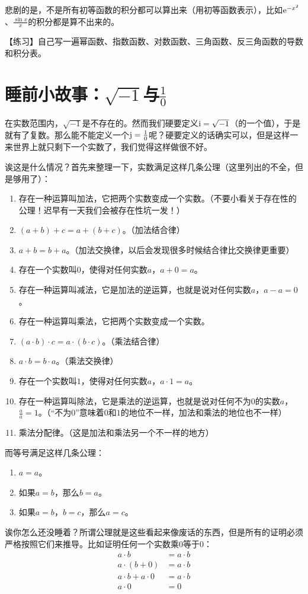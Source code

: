 悲剧的是，不是所有初等函数的积分都可以算出来（用初等函数表示），比如$\mathrm{e}^{-x^2}$、$\frac{\sin x}{x}$的积分都是算不出来的。

【练习】自己写一遍幂函数、指数函数、对数函数、三角函数、反三角函数的导数和积分表。
\section{睡前小故事：$\sqrt{-1}$与$\frac{1}{0}$}
在实数范围内，$\sqrt{-1}$是不存在的。然而我们硬要定义$\mathrm{i}=\sqrt{-1}$（的一个值），于是就有了复数。那么能不能定义一个$\mathrm{j}=\frac{1}{0}$呢？硬要定义的话确实可以，但是这样一来世界上就只剩下一个实数了，我们觉得这样做很不好。

诶这是什么情况？首先来整理一下，实数满足这样几条公理（这里列出的不全，但是够用了）：
\begin{enumerate}
\item 存在一种运算叫加法，它把两个实数变成一个实数。（不要小看关于存在性的公理！迟早有一天我们会被存在性坑一发！）
\item $(a+b)+c=a+(b+c)$。（加法结合律）
\item $a+b=b+a$。（加法交换律，以后会发现很多时候结合律比交换律更重要）
\item 存在一个实数叫$0$，使得对任何实数$a$，$a+0=a$。
\item 存在一种运算叫减法，它是加法的逆运算，也就是说对任何实数$a$，$a-a=0$。
\item 存在一种运算叫乘法，它把两个实数变成一个实数。
\item $(a \cdot b) \cdot c=a \cdot (b \cdot c)$。（乘法结合律）
\item $a \cdot b=b \cdot a$。（乘法交换律）
\item 存在一个实数叫$1$，使得对任何实数$a$，$a \cdot 1=a$。
\item 存在一种运算叫除法，它是乘法的逆运算，也就是说对任何不为$0$的实数$a$，$\frac{a}{a}=1$。（“不为$0$”意味着$0$和$1$的地位不一样，加法和乘法的地位也不一样）
\item 乘法分配律。（这是加法和乘法另一个不一样的地方）
\end{enumerate}

而等号满足这样几条公理：
\begin{enumerate}
\item $a=a$。
\item 如果$a=b$，那么$b=a$。
\item 如果$a=b$，$b=c$，那么$a=c$。
\end{enumerate}

诶你怎么还没睡着？所谓公理就是这些看起来像废话的东西，但是所有的证明必须严格按照它们来推导。比如证明任何一个实数乘$0$等于$0$：
\begin{align*}
a \cdot b&=a \cdot b \\
a \cdot (b+0)&=a \cdot b \\
a \cdot b+a \cdot 0&=a \cdot b \\
a \cdot 0&=0
\end{align*}


